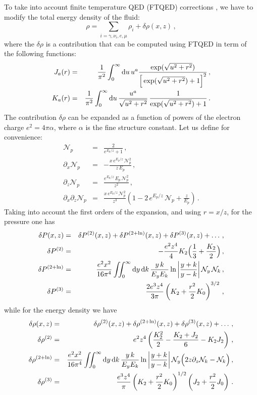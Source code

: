 \documentclass[notitlepage,showpacs,preprintnumbers,amsmath,amssymb,superscriptaddress,prd,onecolumn]{revtex4-1}
\begin{document}
To take into account finite temperature QED (FTQED) corrections
\cite{Fornengo:1997wa,Mangano:2001iu,...},
we have to modify the total energy density of the fluid:
\begin{equation}
\rho
=
\sum_{i=\gamma,{\nu_i},e,\mu}\rho_i
+
\delta\rho(x,z)
\,,
\end{equation}
where the $\delta\rho$ is a contribution that can be computed using FTQED
in term of the following functions:
\begin{eqnarray}
J_a(r)
&=&
\frac{1}{\pi^2}
\int_0^\infty {\rm d}u \, u^a
\frac{\exp(\sqrt{u^2+r^2})}{\Big[\exp(\sqrt{u^2+r^2})+1\Big]^2}
\label{eq:j}
\,,\\
K_a(r)
&=&
\frac{1}{\pi^2}
\int_0^\infty {\rm d}u \, 
\frac{u^a}{\sqrt{u^2+r^2}}\,
\frac{1}{\exp(\sqrt{u^2+r^2})+1}
\label{eq:k}\,.
\end{eqnarray}
The contribution $\delta\rho$ can be expanded as a function of powers of the electron charge
$e^2=4\pi\alpha$, where $\alpha$ is the fine structure constant.
Let us define for convenience:
\begin{eqnarray}
\mathcal{N}_p
&=&
\frac{2}{e^{E_p/z}+1}
\,,\\
\partial_x\mathcal{N}_p
&=&
-\frac{x\,e^{E_p/z}\,\mathcal{N}_p^2}{z\,E_p}
\,,\\
\partial_z\mathcal{N}_p
&=&
\frac{
 e^{E_p/z}\,
 E_p\,
 \mathcal{N}_p^2
}{z^2}
\,,\\
\partial_x\partial_z\mathcal{N}_p
&=&
\frac{
 x\,
 e^{E_p/z}\,
 \mathcal{N}_p^2
}{z^3}
\left(
 1
 -2\,e^{E_p/z}\,\mathcal{N}_p
 +\frac{z}{E_p}
\right)
\,.
\end{eqnarray}
Taking into account the first orders of the expansion, and using $r=x/z$, for the pressure one has \cite{...}
%
\begin{eqnarray}
\delta P(x,z)
&=&
\delta P^{(2)}(x,z)
+
\delta P^{(2+\ln)}(x,z)
+
\delta P^{(3)}(x,z)
+\ldots
\,,
\\
\delta P^{(2)}
&=&
-
\frac{e^2 z^4}{4}K_2
\Big(
 \frac{1}{3}
 +\frac{K_2}{2}
\Big)
\,,\\
\delta P^{(2+\ln)}
&=&
\frac{e^2 x^2}{16\pi^4}
\int\!\!\!\int_0^\infty
{\rm d}y\,
{\rm d}k\,
\frac{y\,k}{E_y E_k}
\ln
\left|
\frac{y+k}{y-k}
\right|
\mathcal{N}_y\,
\mathcal{N}_k
\,,\\
\delta P^{(3)}
&=&
\frac{2e^3z^4}{3\pi}
\left(
K_2
+
\frac{r^2}{2} K_0
\right)^{3/2}
\,,
\end{eqnarray}
while for the energy density we have
\begin{eqnarray}
\delta\rho(x,z)
&=&
\delta\rho^{(2)}(x,z)
+
\delta\rho^{(2+\ln)}(x,z)
+
\delta\rho^{(3)}(x,z)
+\ldots
\,,
\\
\delta\rho^{(2)}
&=&
e^2 z^4
\left(
\frac{K_2^2}{2}
-\frac{K_2+J_2}{6}
-K_2 J_2
\right)
\,,\\
\delta\rho^{(2+\ln)}
&=&
\frac{e^2 x^2}{16\pi^4}
\int\!\!\!\int_0^\infty
{\rm d}y\,
{\rm d}k\,
\frac{y\,k}{E_y E_k}
\ln
\left|
\frac{y+k}{y-k}
\right|
\mathcal{N}_y
\Big(
2z \partial_z \mathcal{N}_k
- \mathcal{N}_k
\Big)
\,,\\
\delta\rho^{(3)}
&=&
\frac{e^3z^4}{\pi}
\left(
K_2
+
\frac{r^2}{2} K_0
\right)^{1/2}
\left(
J_2
+
\frac{r^2}{2} J_0
\right)
\,.
\end{eqnarray}
\end{document}
